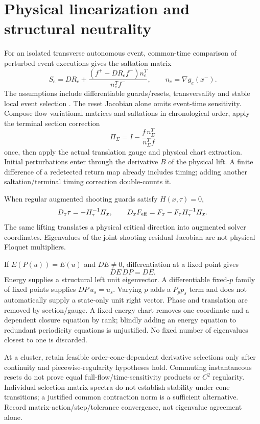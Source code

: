 \documentclass[11pt]{article}
\begin{document}
\section{Physical linearization and structural neutrality}
For an isolated transverse autonomous event, common-time comparison of
perturbed event executions gives the saltation matrix
\begin{equation}\label{eq:saltation}
S_e=DR_e+\frac{(f^+-DR_e f^-)n_e^T}{n_e^Tf^-},
\qquad n_e=\nabla g_e(x^-).
\end{equation}
The assumptions include differentiable guards/resets, transversality and
stable local event selection \cite{kong}. The reset Jacobian alone omits
event-time sensitivity. Compose flow variational matrices and saltations
in chronological order, apply the terminal section correction
\[
\Pi_\Sigma=I-\frac{f\,n_\Sigma^T}{n_\Sigma^Tf}
\]
once, then apply the actual translation gauge and physical chart extraction.
Initial perturbations enter through the derivative $B$ of the physical
lift. A finite difference of a redetected return map already includes timing;
adding another saltation/terminal timing correction double-counts it.

When regular augmented shooting guards satisfy $H(x,\tau)=0$,
\[
D_x\tau=-H_\tau^{-1}H_x,\qquad
D_xF_{\rm eff}=F_x-F_\tau H_\tau^{-1}H_x.
\]
The same lifting translates a physical critical direction into augmented
solver coordinates. Eigenvalues of the joint shooting residual Jacobian are
not physical Floquet multipliers.

If $E(P(u))=E(u)$ and $DE\ne0$, differentiation at a fixed point gives
\[
DE\,DP=DE.
\]
Energy supplies a structural left unit eigenvector. A differentiable fixed-$p$
family of fixed points supplies $DP\,u_s=u_s$. Varying $p$ adds a $P_p p_s$
term and does not automatically supply a state-only unit right vector.
Phase and translation are removed by section/gauge. A fixed-energy chart
removes one coordinate and a dependent closure equation by rank; blindly
adding an energy equation to redundant periodicity equations is unjustified.
No fixed number of eigenvalues closest to one is discarded.

At a cluster, retain feasible order-cone-dependent derivative selections
only after continuity and piecewise-regularity hypotheses hold. Commuting
instantaneous resets do not prove equal full-flow/time-sensitivity products
or $C^2$ regularity. Individual selection-matrix spectra do not establish
stability under cone transitions; a justified common contraction norm is
a sufficient alternative. Record matrix-action/step/tolerance convergence,
not eigenvalue agreement alone.
\end{document}
